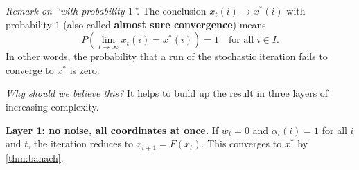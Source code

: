 \documentclass[11pt]{article}
\begin{document}
\emph{Remark on ``with probability $1$''.}
The conclusion $x_t(i) \to x^*(i)$ with probability $1$ (also called \textbf{almost sure convergence}) means
$$
P\!\left(\lim_{t \to \infty} x_t(i) = x^*(i)\right) = 1 \quad \text{for all } i \in I.
$$
In other words, the probability that a run of the stochastic iteration fails to converge to $x^*$ is zero.





\emph{Why should we believe this?}
It helps to build up the result in three layers of increasing complexity.

\textbf{Layer 1: no noise, all coordinates at once.}
If $w_t = 0$ and $\alpha_t(i) = 1$ for all $i$ and $t$, the iteration reduces to $x_{t+1} = F(x_t)$. This converges to $x^*$ by \cref{thm:banach}.
\end{document}
